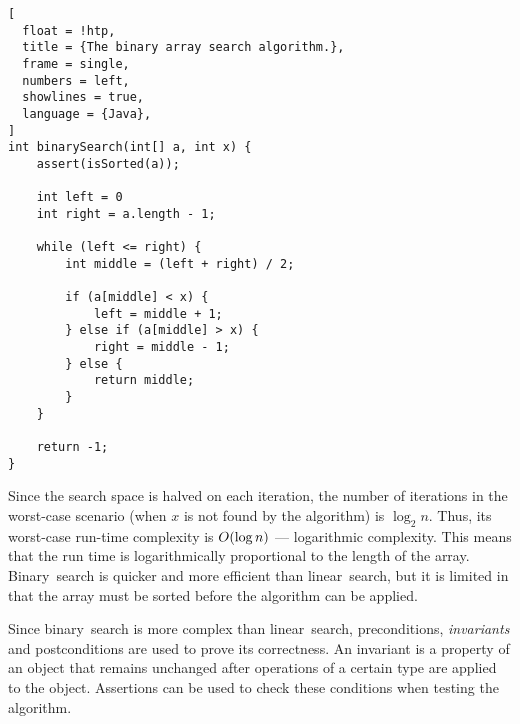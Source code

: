 \begin{lstlisting}[
  float = !htp,
  title = {The binary array search algorithm.},
  frame = single,
  numbers = left,
  showlines = true,
  language = {Java},
]
int binarySearch(int[] a, int x) {
    assert(isSorted(a));

    int left = 0
    int right = a.length - 1;

    while (left <= right) {
        int middle = (left + right) / 2;

        if (a[middle] < x) {
            left = middle + 1;
        } else if (a[middle] > x) {
            right = middle - 1;
        } else {
            return middle;
        }
    }

    return -1;
}
\end{lstlisting}

Since the search space is halved on each iteration, the number of iterations in the worst-case scenario (when \( x \) is not found by the algorithm) is \( \log_{2} n \).
Thus, its worst-case run-time complexity is \( O\!\left(\log n\right) \) --- logarithmic complexity.
This means that the run time is logarithmically proportional to the length of the array.
Binary~search is quicker and more efficient than linear~search, but it is limited in that the array must be sorted before the algorithm can be applied.

Since binary~search is more complex than linear~search, preconditions, \emph{invariants} and postconditions are used to prove its correctness.
An invariant is a property of an object that remains unchanged after operations of a certain type are applied to the object.
Assertions can be used to check these conditions when testing the algorithm.
